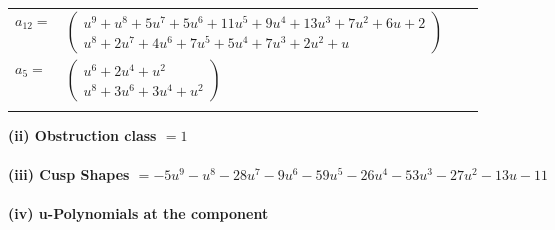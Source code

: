 \documentclass[1p]{elsarticle_modified}
\theoremstyle{definition}
\begin{document}
\begin{tabular}{m{7pt} m{180pt} m{7pt} m{180pt} }
\flushright $a_{12}=$&$\begin{pmatrix}u^9+u^8+5 u^7+5 u^6+11 u^5+9 u^4+13 u^3+7 u^2+6 u+2\\u^8+2 u^7+4 u^6+7 u^5+5 u^4+7 u^3+2 u^2+u\end{pmatrix}$ \\
\flushright $a_{5}=$&$\begin{pmatrix}u^6+2 u^4+u^2\\u^8+3 u^6+3 u^4+u^2\end{pmatrix}$\\&\end{tabular}
\flushleft \textbf{(ii) Obstruction class $= 1$}\\~\\
\flushleft \textbf{(iii) Cusp Shapes $= -5 u^9- u^8-28 u^7-9 u^6-59 u^5-26 u^4-53 u^3-27 u^2-13 u-11$}\\~\\
\newpage\renewcommand{\arraystretch}{1}
\flushleft \textbf{(iv) u-Polynomials at the component}\newline \\
\end{document}
